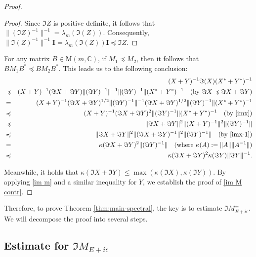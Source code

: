 \documentclass[11pt]{amsart}
\theoremstyle{remark}
\theoremstyle{definition}
\newcommand{\I}{{\mathbf I}}
\begin{document}
\begin{proof}
\begin{proof}
Since $\Im Z$ is positive definite, it follows that $\|(\Im Z)^{-1}\|^{-1} = \lambda_m(\Im(Z))$. Consequently, $ \|\Im(Z)^{-1}\|^{-1} \I = \lambda_m(\Im(Z)) \I \preccurlyeq   \Im Z $.
\end{proof}

For any matrix $ B \in \mathrm{M}(m, \mathbb{C}) $, if $ M_1 \preccurlyeq M_2 $, then it follows that $ B M_1 B^{*} \preccurlyeq B M_2 B^{*} $. This leads us to the following conclusion:
\begin{eqnarray*}
 && (X+Y)^{-1}\Im(X)(X^*+Y^*)^{-1} \\
&  \preccurlyeq& (X+Y)^{-1}(\Im X + \Im Y)\|(\Im Y)^{-1}\|^{-1}\|(\Im Y)^{-1}\|(X^*+Y^*)^{-1} 
  \quad \text{(by \( \Im X \preccurlyeq \Im X + \Im Y \))} \\
  & =&(X+Y)^{-1}(\Im X + \Im Y)^{1/2}\|(\Im Y)^{-1}\|^{-1}(\Im X + \Im Y)^{1/2}\|(\Im Y)^{-1}\|(X^*+Y^*)^{-1} \\
& \preccurlyeq & (X+Y)^{-1}(\Im X + \Im Y)^2\|(\Im Y)^{-1}\|(X^*+Y^*)^{-1} 
\quad \text{(by \eqref{imx})}\\
& \preccurlyeq &  \|\Im X + \Im Y\|^2\|(X+Y)^{-1}\|^2\|(\Im Y)^{-1}\|  \\
&  \preccurlyeq & \|\Im X + \Im Y\|^2\|(\Im X + \Im Y)^{-1}\|^2\|(\Im Y)^{-1}\| \quad \text{(by  \eqref{imx-1})} \\
&  =& \kappa(\Im X + \Im Y)^2\|(\Im Y)^{-1}\| 
 \quad \text{(where \( \kappa(A) := \|A\|\|A^{-1}\| \))} \\
&\preccurlyeq  & \kappa(\Im X + \Im Y)^2\kappa(\Im Y)\|\Im Y\|^{-1}.
\end{eqnarray*}


Meanwhile, it holds that $\kappa(\Im X + \Im Y) \leq \max(\kappa(\Im X), \kappa(\Im Y))$.  By applying \eqref{im m} and a similar inequality for $Y$, we establish the proof of \eqref{im M contr}. 
\end{proof}




Therefore, to prove Theorem \ref{thm:main-spectral}, the key is to estimate $\Im M_{E+i\epsilon}^{\pm}$. We will decompose the proof into several steps.



\subsection{Estimate for \texorpdfstring{$\Im M_{E+i\epsilon}$}{Im M}}\label{estimate m1}
\end{document}
